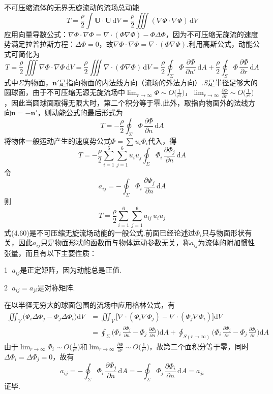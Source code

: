 不可压缩流体的无界无旋流动的流场总动能
\[
T=\frac{\rho}{2}\int\boldsymbol{U}\cdot\boldsymbol{U}\,\mathrm{d}V=\frac{\rho}{2}\iiint(\nabla\Phi\cdot\nabla\Phi)\,\mathrm{d}V
\]
应用向量导数公式：$\nabla\Phi\cdot\nabla\Phi=\nabla\cdot(\Phi\nabla\Phi)-\Phi\Delta\Phi$，因为不可压缩无旋流的速度势满足拉普拉斯方程：$\Delta\Phi=0$，故$\nabla\Phi\cdot\nabla\Phi=\nabla\cdot(\Phi\nabla\Phi)$.利用高斯公式，动能公式可简化为
\[
T=\frac{\rho}{2}\iiint\nabla\Phi\cdot\nabla\Phi\,\mathrm{d}V=\frac{\rho}{2}\iiint\nabla\cdot(\Phi\nabla\Phi)\,\mathrm{d}V=\frac{\rho}{2}\oint_\Sigma\Phi\,\frac{\partial\Phi}{\partial n'}\,\mathrm{d}A+\frac{\rho}{2}\oint_S\Phi\,\frac{\partial\Phi}{\partial r}\,\mathrm{d}A
\]
式中$\Sigma$为物面，$\boldsymbol{n}'$是指向物面的内法线方向（流场的外法方向）.$S$是半径足够大的圆球面，由于不可压缩无源无旋流场中$\displaystyle\lim_{r\to\infty}\Phi\sim O\Big(\frac{1}{r^{2}}\Big)$，$\displaystyle\lim_{r\to\infty}\frac{\partial\Phi}{\partial r}\sim O\Big(\frac{1}{r^{3}}\Big)$，因此当圆球面取得无限大时，第二个积分等于零.此外，取指向物面外的法线方向$\boldsymbol{n}=-\boldsymbol{n}'$，则动能公式的最后形式为
\begin{equation*}
T=-\frac{\rho}{2}\oint_\Sigma\Phi\,\frac{\partial\Phi}{\partial n}\,\mathrm{d}A
\tag{4.58}
\end{equation*}
将物体一般运动产生的速度势公式$\Phi=\sum u_i\Phi_i$代入，得
\[
T=-\frac{\rho}{2}\sum_{i=1}^{6}\sum_{j=1}^{6}u_i u_j\oint_\Sigma\Phi_i\,\frac{\partial\Phi_j}{\partial n}\,\mathrm{d}A
\]
令
\begin{equation*}
a_{ij}=-\oint_\Sigma\Phi_i\,\frac{\partial\Phi_j}{\partial n}\,\mathrm{d}A
\tag{4.59}
\end{equation*}
则
\begin{equation*}
T=\frac{\rho}{2}\sum_{i=1}^{6}\sum_{j=1}^{6}a_{ij}\,u_i u_j
\tag{4.60}
\end{equation*}
式(4.60)是不可压缩无旋流场动能的一般公式.前面已经论述过$\Phi_i$只与物面形状有关，因此$a_{ij}$只是物面形状的函数而与物体运动参数无关，称$a_{ij}$为流体的附加惯性张量，而且有以下主要性质：

\textcircled{1} $a_{ij}$是正定矩阵，因为动能总是正值.

\textcircled{2} $a_{ij}=a_{ji}$是对称矩阵.

在以半径无穷大的球面包围的流场中应用格林公式，有
\begin{align*}
\iiint_V\Big(\Phi_i\Delta\Phi_j-\Phi_j\Delta\Phi_i\Big)\mathrm{d}V&=\iiint_V\big[\nabla\cdot(\Phi_i\nabla\Phi_j)-\nabla\cdot(\Phi_j\nabla\Phi_i)\big]\mathrm{d}V\\
&=\oint_\Sigma\Big(\Phi_i\,\frac{\partial\Phi_j}{\partial n}-\Phi_j\,\frac{\partial\Phi_i}{\partial n}\Big)\mathrm{d}A+\oint_{S(r\to\infty)}\Big(\Phi_i\,\frac{\partial\Phi_j}{\partial r}-\Phi_j\,\frac{\partial\Phi_i}{\partial r}\Big)\mathrm{d}A
\end{align*}
由于$\displaystyle\lim_{r\to\infty}\Phi_i\sim O\Big(\frac{1}{r^{2}}\Big)$和$\displaystyle\lim_{r\to\infty}\frac{\partial\Phi}{\partial r}\sim O\Big(\frac{1}{r^{3}}\Big)$，故第二个面积分等于零，同时$\Delta\Phi_i=\Delta\Phi_j=0$，故有
\[
a_{ij}=-\oint_\Sigma\Phi_i\,\frac{\partial\Phi_j}{\partial n}\,\mathrm{d}A=-\oint_\Sigma\Phi_j\,\frac{\partial\Phi_i}{\partial n}\,\mathrm{d}A=a_{ji}
\]
证毕.

